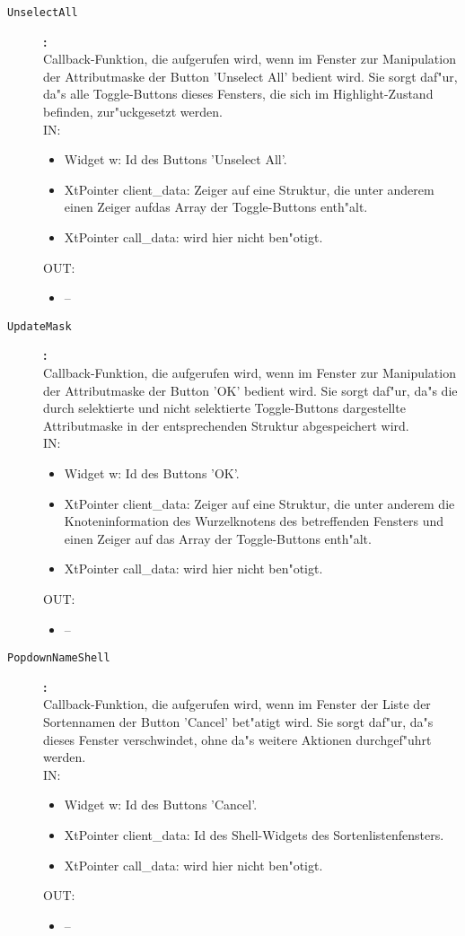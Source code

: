 \begin{description}
\item[\tt UnselectAll]{\bf :\\}
Callback-Funktion, die aufgerufen wird, wenn im Fenster zur Manipulation der Attributmaske der Button 'Unselect All' bedient wird. Sie sorgt daf"ur, da"s alle Toggle-Buttons dieses Fensters, die sich im Highlight-Zustand befinden, zur"uckgesetzt werden. \\
IN:
\begin{itemize}
   \item Widget w:      Id des Buttons 'Unselect All'. \item XtPointer client\_data: Zeiger auf eine Struktur, die unter anderem einen Zeiger aufdas Array der Toggle-Buttons enth"alt. \item XtPointer call\_data:   wird hier nicht ben"otigt.
\end{itemize}
OUT:
\begin{itemize}
   \item --
\end{itemize}

\item[\tt UpdateMask]{\bf :\\}
Callback-Funktion, die aufgerufen wird, wenn im Fenster zur Manipulation der Attributmaske der Button 'OK' bedient wird. Sie sorgt daf"ur, da"s die durch selektierte und nicht selektierte Toggle-Buttons dargestellte Attributmaske in der entsprechenden Struktur abgespeichert wird. \\
IN:
\begin{itemize}
   \item Widget w:      Id des Buttons 'OK'. \item XtPointer client\_data: Zeiger auf eine Struktur, die unter anderem die Knoteninformation des Wurzelknotens des betreffenden Fensters und einen Zeiger auf das Array der Toggle-Buttons enth"alt. \item XtPointer call\_data:   wird hier nicht ben"otigt.
\end{itemize}
OUT:
\begin{itemize}
   \item --
\end{itemize}

\item[\tt PopdownNameShell]{\bf :\\}
Callback-Funktion, die aufgerufen wird, wenn im Fenster der Liste der Sortennamen der Button 'Cancel' bet"atigt wird. Sie sorgt daf"ur, da"s dieses Fenster verschwindet, ohne da"s weitere Aktionen durchgef"uhrt werden. \\
IN:
\begin{itemize}
   \item Widget w:      Id des Buttons 'Cancel'. \item XtPointer client\_data: Id des Shell-Widgets des Sortenlistenfensters. \item XtPointer call\_data:   wird hier nicht ben"otigt.
\end{itemize}
OUT:
\begin{itemize}
   \item --
\end{itemize}


\end{description}
